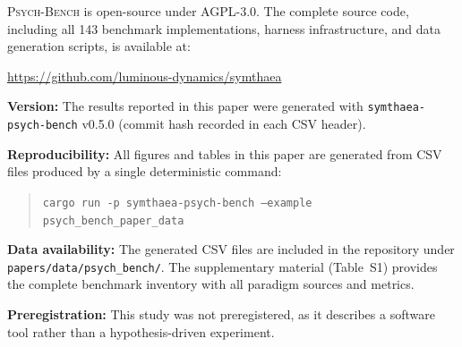 \documentclass[11pt,letterpaper]{article}
\newcommand{\psychbench}{\textsc{Psych-Bench}}
\begin{document}
\psychbench{} is open-source under AGPL-3.0. The complete source code, including all 143 benchmark implementations, harness infrastructure, and data generation scripts, is available at:

\begin{center}
\url{https://github.com/luminous-dynamics/symthaea}
\end{center}

\noindent\textbf{Version:} The results reported in this paper were generated with \texttt{symthaea-psych-bench} v0.5.0 (commit hash recorded in each CSV header).

\noindent\textbf{Reproducibility:} All figures and tables in this paper are generated from CSV files produced by a single deterministic command:
\begin{quote}
\texttt{cargo run -p symthaea-psych-bench --example psych\_bench\_paper\_data}
\end{quote}

\noindent\textbf{Data availability:} The generated CSV files are included in the repository under \texttt{papers/\allowbreak{}data/\allowbreak{}psych\_bench/}. The supplementary material (Table~S1) provides the complete benchmark inventory with all paradigm sources and metrics.

\noindent\textbf{Preregistration:} This study was not preregistered, as it describes a software tool rather than a hypothesis-driven experiment.



\end{document}
